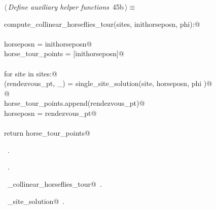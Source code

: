 \documentclass[11.5pt]{report}
\begin{document}

\begin{flushleft} \small
\begin{minipage}{\linewidth}\label{scrap65}\raggedright\small
{} $\langle\,${\itshape Define auxiliary helper functions}\nobreak\ {\footnotesize {45b}}$\,\rangle\equiv$
\vspace{-1ex}
\begin{list}{}{} \item
\mbox{}\verb@def compute_collinear_horseflies_tour(sites, inithorseposn, phi):@\\
\mbox{}\verb@@\\
\mbox{}\verb@      horseposn         = inithorseposn@\\
\mbox{}\verb@      horse_tour_points = [inithorseposn]@\\
\mbox{}\verb@@\\
\mbox{}\verb@      for site in sites:@\\
\mbox{}\verb@          (rendezvous_pt, _) = single_site_solution(site, horseposn, phi )@\\
\mbox{}\verb@            @\\
\mbox{}\verb@          horse_tour_points.append(rendezvous_pt)@\\
\mbox{}\verb@          horseposn = rendezvous_pt@\\
\mbox{}\verb@@\\
\mbox{}\verb@      return horse_tour_points@\\
\mbox{}\verb@@{\NWsep}
\end{list}
\vspace{-1.5ex}
\footnotesize
\begin{list}{}{\setlength{\itemsep}{-\parsep}\setlength{\itemindent}{-\leftmargin}}
\item \NWtxtMacroDefBy\ .
\item \NWtxtMacroRefIn\ .
\item \NWtxtIdentsDefed\nobreak\  \verb@compute_collinear_horseflies_tour@\nobreak\ .\item \NWtxtIdentsUsed\nobreak\  \verb@single_site_solution@\nobreak\ .
\item{}
\end{list}
\end{minipage}\vspace{4ex}
\end{flushleft}
\end{document}
